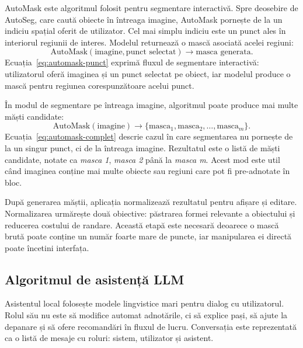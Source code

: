AutoMask este algoritmul folosit pentru segmentare interactivă.
Spre deosebire de AutoSeg, care caută obiecte în întreaga imagine, AutoMask pornește de la un indiciu spațial oferit de utilizator.
Cel mai simplu indiciu este un punct ales în interiorul regiunii de interes.
Modelul returnează o mască asociată acelei regiuni:
\begin{equation}
    \text{AutoMask}(\text{imagine}, \text{punct selectat})
    \rightarrow \text{masca generata}.
    \label{eq:automask-punct}
\end{equation}
Ecuația~\ref{eq:automask-punct} exprimă fluxul de segmentare interactivă: utilizatorul oferă imaginea și un punct selectat pe obiect, iar modelul produce o mască pentru regiunea corespunzătoare acelui punct.

În modul de segmentare pe întreaga imagine, algoritmul poate produce mai multe măști candidate:
\begin{equation}
    \text{AutoMask}(\text{imagine})
    \rightarrow \{\text{masca}_1, \text{masca}_2, \ldots, \text{masca}_m\}.
    \label{eq:automask-complet}
\end{equation}
Ecuația~\ref{eq:automask-complet} descrie cazul în care segmentarea nu pornește de la un singur punct, ci de la întreaga imagine. Rezultatul este o listă de măști candidate, notate ca \textit{masca 1}, \textit{masca 2} până la \textit{masca m}.
Acest mod este util când imaginea conține mai multe obiecte sau regiuni care pot fi pre-adnotate în bloc.

După generarea măștii, aplicația normalizează rezultatul pentru afișare și editare.
Normalizarea urmărește două obiective: păstrarea formei relevante a obiectului și reducerea costului de randare.
Această etapă este necesară deoarece o mască brută poate conține un număr foarte mare de puncte, iar manipularea ei directă poate încetini interfața.

\subsection{Algoritmul de asistență LLM}
\label{subsec:algoritm-llm}

Asistentul local folosește modele lingvistice mari pentru dialog cu utilizatorul.
Rolul său nu este să modifice automat adnotările, ci să explice pași, să ajute la depanare și să ofere recomandări în fluxul de lucru.
Conversația este reprezentată ca o listă de mesaje cu roluri: sistem, utilizator și asistent.

